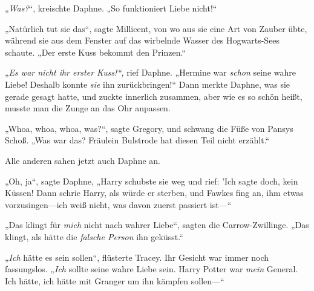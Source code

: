 „\emph{Was?}“, kreischte Daphne. „So funktioniert Liebe nicht!“

„Natürlich tut sie das“, sagte Millicent, von wo aus sie eine Art von Zauber übte, während sie aus dem Fenster auf das wirbelnde Wasser des Hogwarts-Sees schaute. „Der erste Kuss bekommt den Prinzen.“

„\emph{Es war nicht ihr erster Kuss!“,} rief Daphne. „Hermine war \emph{schon} seine wahre Liebe! Deshalb konnte \emph{sie} ihn zurückbringen!“ Dann merkte Daphne, was sie gerade gesagt hatte, und zuckte innerlich zusammen, aber wie es so schön heißt, musste man die Zunge an das Ohr anpassen.

„Whoa, whoa, whoa, was?“, sagte Gregory, und schwang die Füße von Pansys Schoß. „Was war das? Fräulein Bulstrode hat diesen Teil nicht erzählt.“

Alle anderen sahen jetzt auch Daphne an.

„Oh, ja“, sagte Daphne, „Harry schubste sie weg und rief: 'Ich sagte doch, kein Küssen! Dann schrie Harry, als würde er sterben, und Fawkes fing an, ihm etwas vorzusingen—ich weiß nicht, was davon zuerst passiert ist—“

„Das klingt für \emph{mich} nicht nach wahrer Liebe“, sagten die Carrow-Zwillinge. „Das klingt, als hätte die \emph{falsche Person} ihn geküsst.“

„\emph{Ich} hätte es sein sollen“, flüsterte Tracey. Ihr Gesicht war immer noch fassungslos. „\emph{Ich} sollte seine wahre Liebe sein. Harry Potter war \emph{mein} General. Ich hätte, ich hätte mit Granger um ihn kämpfen sollen—“

